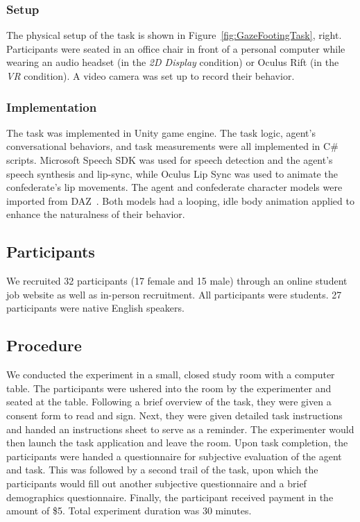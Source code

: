 \subsubsection{Setup}

The physical setup of the task is shown in Figure~\ref{fig:GazeFootingTask}, right. Participants were seated in an office chair in front of a personal computer while wearing an audio headset (in the \emph{2D Display} condition) or Oculus Rift (in the \emph{VR} condition). A video camera was set up to record their behavior.

\subsubsection{Implementation}

The task was implemented in Unity game engine. The task logic, agent's conversational behaviors, and task measurements were all implemented in C\# scripts. Microsoft Speech SDK was used for speech detection and the agent's speech synthesis and lip-sync, while Oculus Lip Sync was used to animate the confederate's lip movements. The agent and confederate character models were imported from DAZ~\citep{daz3d}. Both models had a looping, idle body animation applied to enhance the naturalness of their behavior.

\subsection{Participants}

We recruited 32 participants (17 female and 15 male) through an online student job website as well as in-person recruitment. All participants were students. 27 participants were native English speakers.

\subsection{Procedure}

We conducted the experiment in a small, closed study room with a computer table. The participants were ushered into the room by the experimenter and seated at the table. Following a brief overview of the task, they were given a consent form to read and sign. Next, they were given detailed task instructions and handed an instructions sheet to serve as a reminder. The experimenter would then launch the task application and leave the room. Upon task completion, the participants were handed a questionnaire for subjective evaluation of the agent and task. This was followed by a second trail of the task, upon which the participants would fill out another subjective questionnaire and a brief demographics questionnaire. Finally, the participant received payment in the amount of \$5. Total experiment duration was 30 minutes.

